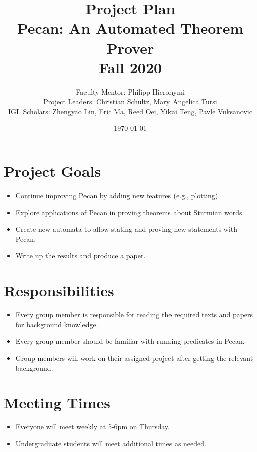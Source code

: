 \documentclass[12pt]{article}
\begin{document}
\title{Project Plan\\ {Pecan: An Automated Theorem Prover} \\Fall 2020}
\author{Faculty Mentor: {Philipp Hieronymi} \\
	Project Leaders: {Christian Schultz, Mary Angelica Tursi}\\
	IGL Scholars: { Zhengyao Lin, Eric Ma, Reed Oei, Yikai Teng, Pavle Vuksanovic }}
\date{\today}
\maketitle
\section{Project Goals}
\begin{itemize} 
    \item Continue improving Pecan by adding new features (e.g., plotting).
    \item Explore applications of Pecan in proving theorems about Sturmian words.
    \item Create new automata to allow stating and proving new statements with Pecan.
    \item Write up the results and produce a paper. 
\end{itemize}

\section{Responsibilities}
\begin{itemize}
    \item Every group member is responsible for reading the required texts and papers for background knowledge.
    \item Every group member should be familiar with running predicates in Pecan. 
    \item Group members will work on their assigned project after getting the relevant background.
\end{itemize}

\section{Meeting Times}
\begin{itemize}
	\item Everyone will meet weekly at 5-6pm on Thursday.
	\item Undergraduate students will meet additional times as needed.
\end{itemize}
\end{document}
